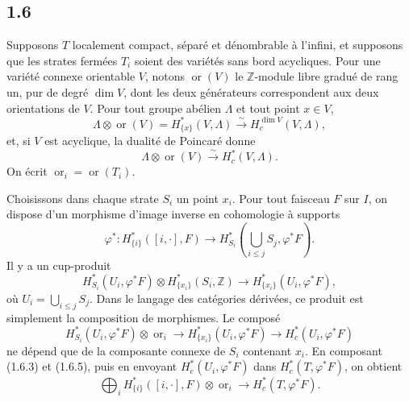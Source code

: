 \documentclass[11pt]{article}
\theoremstyle{definition}
\newcommand{\ZZ}{\mathbb Z}
\newcommand{\ornt}{\operatorname{or}}
\begin{document}
\subsection*{1.6}
Supposons $T$ localement compact, séparé et dénombrable à l'infini, et supposons que les strates fermées $T_i$ soient des variétés sans bord acycliques. Pour une variété connexe orientable $V$, notons $\ornt(V)$ le $\ZZ$-module libre gradué de rang un, pur de degré $\dim V$, dont les deux générateurs correspondent aux deux orientations de $V$. Pour tout groupe abélien $\Lambda$ et tout point $x\in V$,
\begin{equation}
\Lambda\otimes\ornt(V)=H^*_{\{x\}}(V,\Lambda)\xrightarrow{\sim}H_c^{\dim V}(V,\Lambda),\tag{1.6.1}
\end{equation}
et, si $V$ est acyclique, la dualité de Poincaré donne
\begin{equation}
\Lambda\otimes\ornt(V)\xrightarrow{\sim}H_c^*(V,\Lambda).\tag{1.6.2}
\end{equation}
On écrit $\ornt_i=\ornt(T_i)$.

Choisissons dans chaque strate $S_i$ un point $x_i$. Pour tout faisceau $F$ sur $I$, on dispose d'un morphisme d'image inverse en cohomologie à supports
\begin{equation}
\varphi^*:H^*_{\{i\}}([i,\cdot],F)\longrightarrow H^*_{S_i}\left(\bigcup_{i\leq j}S_j,\varphi^*F\right).\tag{1.6.3}
\end{equation}
Il y a un cup-produit
\begin{equation}
H^*_{S_i}(U_i,\varphi^*F)\otimes H^*_{\{x_i\}}(S_i,\ZZ)\longrightarrow H^*_{\{x_i\}}(U_i,\varphi^*F),\tag{1.6.4}
\end{equation}
où $U_i=\bigcup_{i\leq j}S_j$. Dans le langage des catégories dérivées, ce produit est simplement la composition de morphismes. Le composé
\begin{equation}
H^*_{S_i}(U_i,\varphi^*F)\otimes\ornt_i\longrightarrow H^*_{\{x_i\}}(U_i,\varphi^*F)\longrightarrow H^*_c(U_i,\varphi^*F)\tag{1.6.5}
\end{equation}
ne dépend que de la composante connexe de $S_i$ contenant $x_i$. En composant (1.6.3) et (1.6.5), puis en envoyant $H_c^*(U_i,\varphi^*F)$ dans $H_c^*(T,\varphi^*F)$, on obtient
\begin{equation}
\bigoplus_i H^*_{\{i\}}([i,\cdot],F)\otimes\ornt_i\longrightarrow H_c^*(T,\varphi^*F).\tag{1.6.7}
\end{equation}
\end{document}
